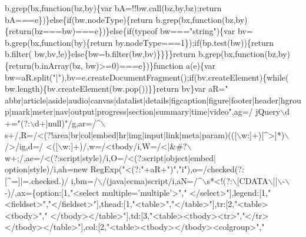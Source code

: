 \begin{DoxyCode}
      b.grep(bx,\textcolor{keyword}{function}(bz,by)\{var bA=!!bw.call(bz,by,bz);\textcolor{keywordflow}{return} bA===e\})\}\textcolor{keywordflow}{else}\{\textcolor{keywordflow}{if}(bw.nodeType)\{\textcolor{keywordflow}{return} 
      b.grep(bx,\textcolor{keyword}{function}(bz,by)\{\textcolor{keywordflow}{return}(bz===bw)===e\})\}\textcolor{keywordflow}{else}\{\textcolor{keywordflow}{if}(typeof bw===\textcolor{stringliteral}{"string"})\{var bv=
      b.grep(bx,\textcolor{keyword}{function}(by)\{\textcolor{keywordflow}{return} by.nodeType===1\});\textcolor{keywordflow}{if}(bp.test(bw))\{\textcolor{keywordflow}{return} b.filter(
      bw,bv,!e)\}\textcolor{keywordflow}{else}\{bw=b.filter(bw,bv)\}\}\}\}\textcolor{keywordflow}{return} b.grep(bx,\textcolor{keyword}{function}(bz,by)\{\textcolor{keywordflow}{return}(b.inArray(bz,
      bw)>=0)===e\})\}\textcolor{keyword}{function} a(e)\{var bw=aR.split(\textcolor{stringliteral}{"|"}),bv=e.createDocumentFragment();\textcolor{keywordflow}{if}(bv.createElement)\{\textcolor{keywordflow}{while}(
      bw.length)\{bv.createElement(bw.pop())\}\}\textcolor{keywordflow}{return} bv\}var aR=\textcolor{stringliteral}{"
      abbr|article|aside|audio|canvas|datalist|details|figcaption|figure|footer|header|hgroup|mark|meter|nav|output|progress|section|summary|time|video"},ag=/ jQuery\(\backslash\)d
      +=\textcolor{stringliteral}{"(?:\(\backslash\)d+|null)"}/g,ar=/^\(\backslash\)s+/,R=/<(?!area|br|col|embed|hr|img|input|link|meta|param)(([\(\backslash\)w:]+)[^>]*)\(\backslash\)/>/ig,d=/
      <([\(\backslash\)w:]+)/,w=/<tbody/i,W=/<|&#?\(\backslash\)w+;/,ae=/<(?:script|style)/i,O=/<(?:script|\textcolor{keywordtype}{object}|embed|
      option|style)/i,ah=\textcolor{keyword}{new} RegExp(\textcolor{stringliteral}{"<(?:"}+aR+\textcolor{stringliteral}{")"},\textcolor{stringliteral}{"i"}),o=/checked\s*(?:[^=]|=\s*.checked.)/
      i,bm=/\(\backslash\)/(java|ecma)script/i,aN=/^\(\backslash\)s*<!(?:\(\backslash\)[CDATA\(\backslash\)[|\(\backslash\)-\(\backslash\)-)/,ax=\{option:[1,\textcolor{stringliteral}{"<select multiple='multiple'>"},\textcolor{stringliteral}{"
      </select>"}],legend:[1,\textcolor{stringliteral}{"<fieldset>"},\textcolor{stringliteral}{"</fieldset>"}],thead:[1,\textcolor{stringliteral}{"<table>"},\textcolor{stringliteral}{"</table>"}],tr:[2,\textcolor{stringliteral}{"<table><tbody>"},\textcolor{stringliteral}{"
      </tbody></table>"}],td:[3,\textcolor{stringliteral}{"<table><tbody><tr>"},\textcolor{stringliteral}{"</tr></tbody></table>"}],col:[2,\textcolor{stringliteral}{"<table><tbody></tbody><colgroup>"},\textcolor{stringliteral}{"
}
\end{DoxyCode}
